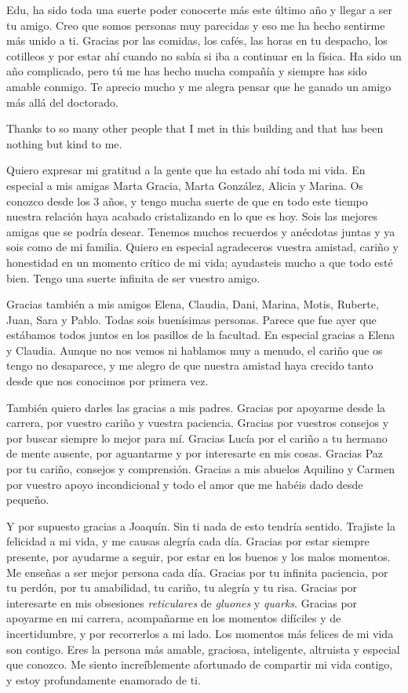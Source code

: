 Edu, ha sido toda una suerte poder conocerte más este último año y llegar a ser tu amigo. Creo que somos personas muy parecidas y eso me ha hecho sentirme más unido a ti. Gracias por las comidas, los cafés, las horas en tu despacho, los cotilleos y por estar ahí cuando no sabía si iba a continuar en la física. Ha sido un año complicado, pero tú me has hecho mucha compañía y siempre has sido amable conmigo. Te aprecio mucho y me alegra pensar que he ganado un amigo más allá del doctorado.

Thanks to so many other people that I met in this building and that has been nothing but kind to me. 

Quiero expresar mi gratitud a la gente que ha estado ahí toda mi vida. En especial a mis amigas Marta Gracia, Marta González, Alicia y Marina. Os conozco desde los 3 años, y tengo mucha suerte de que en todo este tiempo nuestra relación haya acabado cristalizando en lo que es hoy. Sois las mejores amigas que se podría desear. Tenemos muchos recuerdos y anécdotas juntas y ya sois como de mi familia. Quiero en especial agradeceros vuestra amistad, cariño y honestidad en un momento crítico de mi vida; ayudasteis mucho a que todo esté bien. Tengo una suerte infinita de ser vuestro amigo.

Gracias también a mis amigos Elena, Claudia, Dani, Marina, Motis, Ruberte, Juan, Sara y Pablo. Todas sois buenísimas personas. Parece que fue ayer que estábamos todos juntos en los pasillos de la facultad. En especial gracias a Elena y Claudia. Aunque no nos vemos ni hablamos muy a menudo, el cariño que os tengo no desaparece, y me alegro de que nuestra amistad haya crecido tanto desde que nos conocimos por primera vez.

También quiero darles las gracias a mis padres. Gracias por apoyarme desde la carrera, por vuestro cariño y vuestra paciencia. Gracias por vuestros consejos y por buscar siempre lo mejor para mí. Gracias Lucía por el cariño a tu hermano de mente ausente, por aguantarme y por interesarte en mis cosas. Gracias Paz por tu cariño, consejos y comprensión. Gracias a mis abuelos Aquilino y Carmen por vuestro apoyo incondicional y todo el amor que me habéis dado desde pequeño. 

Y por supuesto gracias a Joaquín. Sin ti nada de esto tendría sentido. Trajiste la felicidad a mi vida, y me causas alegría cada día. Gracias por estar siempre presente, por ayudarme a seguir, por estar en los buenos y los malos momentos. Me enseñas a ser mejor persona cada día. Gracias por tu infinita paciencia, por tu perdón, por tu amabilidad, tu cariño, tu alegría y tu risa. Gracias por interesarte en mis obsesiones \textit{reticulares} de \textit{gluones} y \textit{quarks}. Gracias por apoyarme en mi carrera, acompañarme en los momentos difíciles y de incertidumbre, y por recorrerlos a mi lado. Los momentos más felices de mi vida son contigo. Eres la persona más amable, graciosa, inteligente, altruista y especial que conozco. Me siento increíblemente afortunado de compartir mi vida contigo, y estoy profundamente enamorado de ti.


